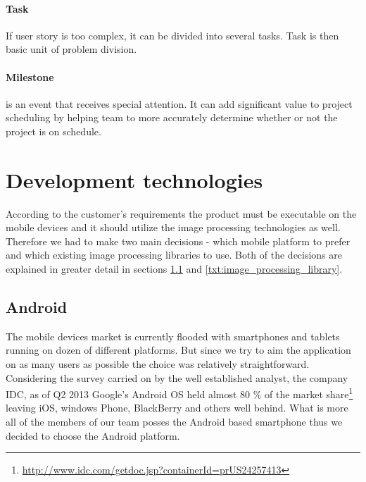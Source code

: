 \paragraph{Task}
If user story is too complex, it can be divided into several tasks. 
Task is then basic unit of problem division.

\paragraph{Milestone} is an event that receives special attention. It can add significant value to project scheduling by helping team to more accurately determine whether or not the project is on schedule.


\section{Development technologies} \label{txt:development technologies}

According to the customer's requirements the product must be executable on the mobile devices and it should utilize the image processing technologies as well. Therefore we had to make two main decisions - which mobile platform to prefer and which existing image processing libraries to use. Both of the decisions are explained in greater detail in sections \ref{txt:mobile_platform} and \ref{txt:image_processing_library}.


\subsection{Android} \label{txt:mobile_platform}

The mobile devices market is currently flooded with smartphones and tablets running on dozen of different platforms. 
But since we try to aim the application on as many users as possible the choice was relatively straightforward.
Considering the survey carried on by the well established analyst, the company IDC, as of Q2 2013 Google's Android OS held almost 80 \% of the market share\footnote{\url{http://www.idc.com/getdoc.jsp?containerId=prUS24257413}} leaving iOS, windows Phone, BlackBerry and others well behind.
What is more all of the members of our team posses the Android based smartphone thus we decided to choose the Android platform.

